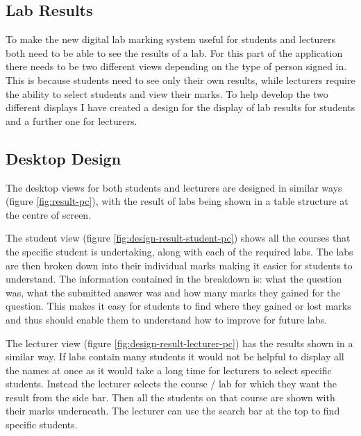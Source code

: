 \documentclass[11pt]{report}
\begin{document}
\subsection{Lab Results}
To make the new digital lab marking system useful for students and lecturers both need to be able to see the results of a lab. For this part of the application there needs to be two different views depending on the type of person signed in. This is because students need to see only their own results, while lecturers require the ability to select students and view their marks. To help develop the two different displays I have created a design for the display of lab results for students and a further one for lecturers.

\subsection*{Desktop Design}

The desktop views for both students and lecturers are designed in similar ways (figure \ref{fig:result-pc}), with the result of labs being shown in a table structure at the centre of screen. 

The student view (figure \ref{fig:design-result-student-pc}) shows all the courses that the specific student is undertaking, along with each of the required labs. The labs are then broken down into their individual marks making it easier for students to understand. The information contained in the breakdown is: what the question was, what the submitted answer was and how many marks they gained for the question. This makes it easy for students to find where they gained or lost marks and  thus should enable them to understand how to improve for future labs.

The lecturer view (figure \ref{fig:design-result-lecturer-pc}) has the results shown in a similar way. If labs contain many students it would not be helpful to display all the names at once as it would take a long time for lecturers to select specific students. Instead the lecturer selects the course / lab for which they want the result from the side bar. Then all the students on that course are shown with their marks underneath. The lecturer can use the search bar at the top to find specific students.
\end{document}
